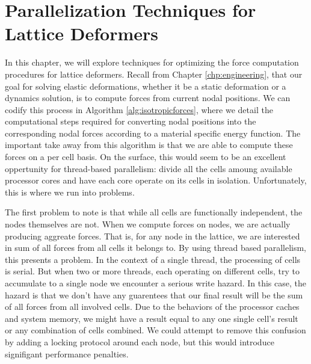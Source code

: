\chapter{Parallelization Techniques for Lattice Deformers}
\label{chp:parallelization}

In this chapter, we will explore techniques for optimizing the force
computation procedures for lattice deformers. Recall from Chapter
\ref{chp:engineering}, that our goal for solving elastic deformations,
whether it be a static deformation or a dynamics solution, is to
compute forces from current nodal positions. We can codify this
process in Algorithm \ref{alg:isotropicforces}, where we detail the
computational steps required for converting nodal positions into the
corresponding nodal forces according to a material specific energy
function. The important take away from this algorithm is that we are
able to compute these forces on a per cell basis. On the surface, this
would seem to be an excellent oppertunity for thread-based
parallelism: divide all the cells amoung available processor cores and
have each core operate on its cells in isolation. Unfortunately, this
is where we run into problems.

The first problem to note is that while all cells are functionally
independent, the nodes themselves are not. When we compute forces on
nodes, we are actually producing aggreate forces. That is, for any
node in the lattice, we are interested in sum of all forces from all
cells it belongs to. By using thread based parallelism, this
presents a problem. In the context of a single thread, the processing
of cells is serial. But when two or more threads, each operating on
different cells, try to accumulate to a single node we encounter a serious
write hazard. In this case, the hazard is that we don't have any
guarentees that our final result will be the sum of all forces from
all involved cells. Due to the behaviors of the processor caches and
system memory, we might have a result equal to any one single cell's
result or any combination of cells combined. We could attempt to
remove this confusion by adding a locking protocol around each node,
but this would introduce signifigant performance penalties.

